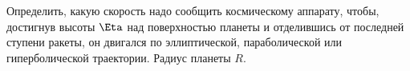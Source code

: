 Определить, какую скорость надо сообщить космическому аппарату, чтобы, достигнув высоты $\Eta$ над поверхностью планеты
и отделившись от последней ступени ракеты, он двигался по эллиптической, параболической или гиперболической траектории.
Радиус планеты $R$.